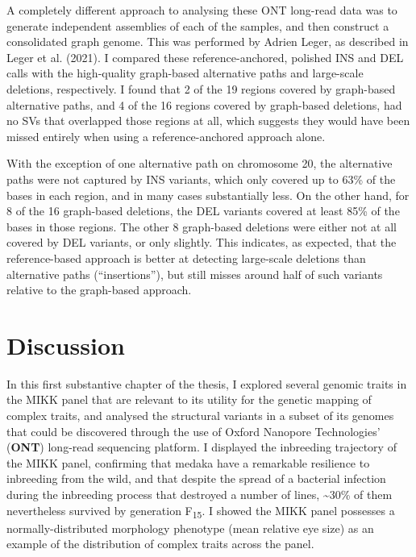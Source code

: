 \documentclass[
]{book}
\begin{document}
A completely different approach to analysing these ONT long-read data was to generate independent assemblies of each of the samples, and then construct a consolidated graph genome. This was performed by Adrien Leger, as described in Leger et al. (2021). I compared these reference-anchored, polished INS and DEL calls with the high-quality graph-based alternative paths and large-scale deletions, respectively. I found that 2 of the 19 regions covered by graph-based alternative paths, and 4 of the 16 regions covered by graph-based deletions, had no SVs that overlapped those regions at all, which suggests they would have been missed entirely when using a reference-anchored approach alone.

With the exception of one alternative path on chromosome 20, the alternative paths were not captured by INS variants, which only covered up to 63\% of the bases in each region, and in many cases substantially less. On the other hand, for 8 of the 16 graph-based deletions, the DEL variants covered at least 85\% of the bases in those regions. The other 8 graph-based deletions were either not at all covered by DEL variants, or only slightly. This indicates, as expected, that the reference-based approach is better at detecting large-scale deletions than alternative paths (``insertions''), but still misses around half of such variants relative to the graph-based approach.

\hypertarget{discussion}{%
\section{Discussion}\label{discussion}}

In this first substantive chapter of the thesis, I explored several genomic traits in the MIKK panel that are relevant to its utility for the genetic mapping of complex traits, and analysed the structural variants in a subset of its genomes that could be discovered through the use of Oxford Nanopore Technologies' (\textbf{ONT}) long-read sequencing platform. I displayed the inbreeding trajectory of the MIKK panel, confirming that medaka have a remarkable resilience to inbreeding from the wild, and that despite the spread of a bacterial infection during the inbreeding process that destroyed a number of lines, \textasciitilde30\% of them nevertheless survived by generation F\textsubscript{15}. I showed the MIKK panel possesses a normally-distributed morphology phenotype (mean relative eye size) as an example of the distribution of complex traits across the panel.
\end{document}
